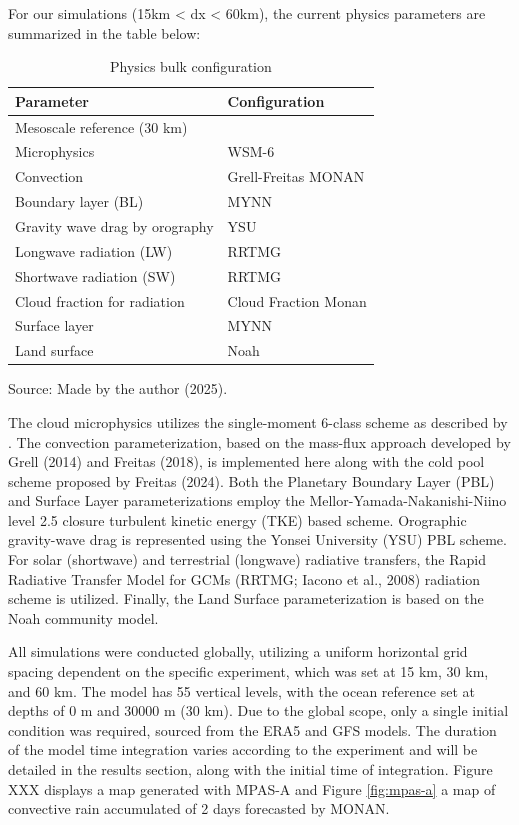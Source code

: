 For our simulations (15km < dx < 60km), the current physics parameters are summarized in the table below:

\begin{table}[htbp]
	\centering
	\caption{Physics bulk configuration}
	\label{tab:physics-config}
	\begin{tabular}{@{}ll@{}}
		\toprule
		\textbf{Parameter} & \textbf{Configuration} \\
		\midrule
		Mesoscale reference (30 km) & \\
		Microphysics & WSM-6 \\
		Convection & Grell-Freitas MONAN \\
		Boundary layer (BL) & MYNN \\
		Gravity wave drag by orography & YSU \\
		Longwave radiation (LW) & RRTMG \\
		Shortwave radiation (SW) & RRTMG \\
		Cloud fraction for radiation & Cloud Fraction Monan \\
		Surface layer & MYNN \\
		Land surface & Noah \\
		\bottomrule
	\end{tabular}
	
	\vspace{2mm}
	{\centering Source: Made by the author (2025).\par}
	
\end{table}

The cloud microphysics utilizes the single-moment 6-class scheme as described by . The convection parameterization, based on the mass-flux approach developed by Grell (2014) and Freitas (2018), is implemented here along with the cold pool scheme proposed by Freitas (2024). Both the Planetary Boundary Layer (PBL) and Surface Layer parameterizations employ the Mellor-Yamada-Nakanishi-Niino level 2.5 closure turbulent kinetic energy (TKE) based scheme. Orographic gravity-wave drag is represented using the Yonsei University (YSU) PBL scheme. For solar (shortwave) and terrestrial (longwave) radiative transfers, the Rapid Radiative Transfer Model for GCMs (RRTMG; Iacono et al., 2008) radiation scheme is utilized. Finally, the Land Surface parameterization is based on the Noah community model.

All simulations were conducted globally, utilizing a uniform horizontal grid spacing dependent on the specific experiment, which was set at 15 km, 30 km, and 60 km. The model has 55 vertical levels, with the ocean reference set at depths of 0 m and 30000 m (30 km). Due to the global scope, only a single initial condition was required, sourced from the ERA5 and GFS models. The duration of the model time integration varies according to the experiment and will be detailed in the results section, along with the initial time of integration. Figure XXX displays a map generated with MPAS-A and Figure \ref{fig:mpas-a} a map of convective rain accumulated of 2 days forecasted by MONAN.

